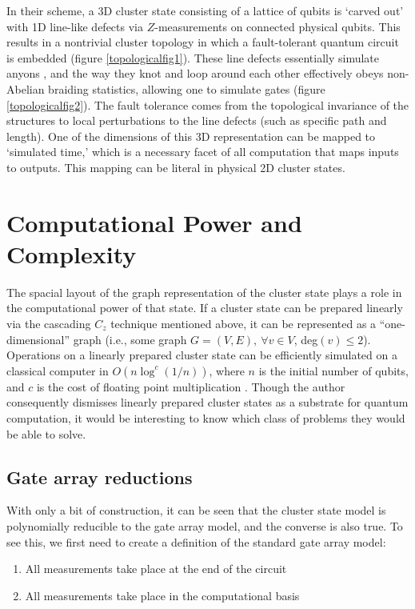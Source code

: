 \documentclass[twocolumn]{Styles/IEEEtran11}
\begin{document}
In their scheme, a 3D cluster state consisting of a lattice of qubits is `carved out' with 1D line-like defects via $Z$-measurements on connected physical qubits. This results in a nontrivial cluster topology in which a fault-tolerant quantum circuit is embedded (figure \ref{topologicalfig1}). These line defects essentially simulate anyons \cite{sarma2008}, and the way they knot and loop around each other effectively obeys non-Abelian braiding statistics, allowing one to simulate gates (figure \ref{topologicalfig2}). The fault tolerance comes from the topological invariance of the structures to local perturbations to the line defects (such as specific path and length). One of the dimensions of this 3D representation can be mapped to `simulated time,' which is a necessary facet of all computation that maps inputs to outputs. This mapping can be literal in physical 2D cluster states.

\section{Computational Power and Complexity}
The spacial layout of the graph representation of the cluster state plays a role in the computational power of that state. If a cluster state can be prepared linearly via the cascading $C_z$ technique mentioned above, it can be represented as a  ``one-dimensional'' graph (i.e., some graph $G=(V,E),\ \forall v\in V$, deg$(v)\leq 2$). Operations on a linearly prepared cluster state can be efficiently simulated on a classical computer in $O(n\log ^c (1/n))$, where $n$ is the initial number of qubits, and $c$ is the cost of floating point multiplication \cite{nielsen2006cluster}. Though the author consequently dismisses linearly prepared cluster states as a substrate for quantum computation, it would be interesting to know which class of problems they would be able to solve.

\subsection{Gate array reductions}


With only a bit of construction, it can be seen that the cluster state model is polynomially reducible to the gate array model, and the converse is also true. To see this, we first need to create a definition of the standard gate array model:

\vspace{1em}
\begin{enumerate}
\item All measurements take place at the end of the circuit
\item All measurements take place in the computational basis
\end{enumerate}
\end{document}
